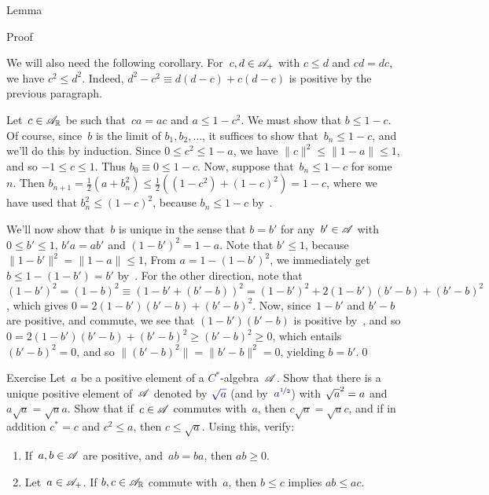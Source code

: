 \documentclass[a]{subfiles}
\begin{document}
\begin{parsec}
\begin{point}{Lemma}
\begin{point}{Proof}
\begin{point}
We will also need the following corollary.
For~$c,d\in\mathscr{A}_{+}$ with $c\leq d$ and $cd=dc$,
we have $c^2\leq d^2$.
Indeed, $d^2-c^2 \equiv d(d-c)+c(d-c)$
is positive by the previous paragraph.
\end{point}
\begin{point}%
Let~$c\in\mathscr{A}_{\mathbb{R}}$ be such that~$ca=ac$ and  $a\leq 1-c^2$.
We must show that $b\leq 1-c$.
Of course,
since~$b$ is the limit of $b_1,b_2,\dotsc$,
it suffices to show that~$b_n\leq 1-c$,
and we'll do this by induction.
Since $0\leq c^2 \leq 1-a$,
 we have $\|c\|^2\leq \|1-a\|\leq 1$,
and so $-1\leq c\leq 1$.
Thus $b_0\equiv 0\leq 1-c$.
Now, suppose that~$b_n\leq 1-c$ for some~$n$.
Then $b_{n+1} = \frac{1}{2}(a+b_n^2)
\leq \frac{1}{2}( (1-c^2)+(1-c)^2) = 1-c$,
where we have used that $b_n^2 \leq (1-c)^2$,
because $b_n\leq 1-c$
by~.
\begin{point}%
We'll now show that~$b$ is unique
in the sense that $b=b'$
for any~$b'\in \mathscr{A}$ with $0\leq b'\leq 1$,
 $b'a=ab'$ and $(1-b')^2=1-a$.
Note that $b'\leq 1$,
because $\|1-b'\|^2=\|1-a\|\leq 1$,
From $a=1-(1-b')^2$,
we immediately get $b \leq 1-(1-b')=b'$ by~.
For the other direction,
note that
$(1-b')^2= (1-b)^2 \equiv (1-b'+(b'-b))^2 = (1-b')^2+2(1-b')(b'-b)+(b'-b)^2$,
which gives $0=2(1-b')(b'-b)+(b'-b)^2$.
Now, since~$1-b'$ and $b'-b$ are positive,
and commute, we see that $(1-b')(b'-b)$ is positive 
by~, and so 
 $0=2(1-b')(b'-b)+(b'-b)^2\geq (b'-b)^2 \geq 0$,
which entails $(b'-b)^2=0$, and so $\|(b'-b)^2\|=\|b'-b\|^2=0$,
yielding $b=b'$.\qed
\end{point}
\end{point}
\end{point}
\end{point}
\begin{point}[sqrt]{Exercise}%
%
Let~$a$ be a positive element of a $C^*$-algebra~$\mathscr{A}$.
Show that there is a unique 
positive element of~$\mathscr{A}$
denoted by $\Define{\sqrt{a}}$ 
(and by~$\Define{a^{\nicefrac{1}{2}}}$)
with $\smash{\sqrt{a}^2}=a$
and $a\sqrt{a}=\sqrt{a}a$.
Show that if~$c\in\mathscr{A}$ commutes with~$a$,
then $c\sqrt{a}=\sqrt{a}c$,
and if in addition $c^*=c$ and $c^2\leq a$,
then $c\leq \sqrt{a}$.
Using this, verify:
\begin{enumerate}
\item
If~$a,b\in \mathscr{A}$ are positive,
and~$ab=ba$,
then $ab\geq 0$.

\item
Let~$a\in\mathscr{A}_{+}$.
If $b,c\in \mathscr{A}_{\mathbb{R}}$ commute with~$a$,
then $b\leq c$ implies $ab\leq ac$.


\end{enumerate}
\end{point}
\end{parsec}
\end{document}
